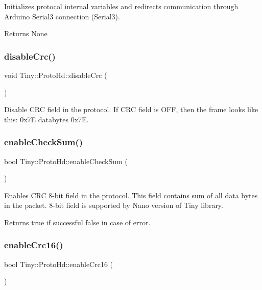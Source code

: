 Initializes protocol internal variables and redirects communication through Arduino Serial3 connection (Serial3). \begin{DoxyReturn}{Returns}
None 
\end{DoxyReturn}
\mbox{\label{classTiny_1_1ProtoHd_ae90a0a40de0b71a015f7f7f940440fa0}} 
\subsubsection{\texorpdfstring{disable\+Crc()}{disableCrc()}}
{\footnotesize\ttfamily void Tiny\+::\+Proto\+Hd\+::disable\+Crc (\begin{DoxyParamCaption}{ }\end{DoxyParamCaption})}

Disable C\+RC field in the protocol. If C\+RC field is O\+FF, then the frame looks like this\+: 0x7E databytes 0x7E. \mbox{\label{classTiny_1_1ProtoHd_ace4e6b993532b3eb47d025b8db94192d}} 
\subsubsection{\texorpdfstring{enable\+Check\+Sum()}{enableCheckSum()}}
{\footnotesize\ttfamily bool Tiny\+::\+Proto\+Hd\+::enable\+Check\+Sum (\begin{DoxyParamCaption}{ }\end{DoxyParamCaption})}

Enables C\+RC 8-\/bit field in the protocol. This field contains sum of all data bytes in the packet. 8-\/bit field is supported by Nano version of Tiny library. \begin{DoxyReturn}{Returns}
true if successful false in case of error. 
\end{DoxyReturn}
\mbox{\label{classTiny_1_1ProtoHd_a0887adedc93b7538dbaef3fc8e0b2819}} 
\subsubsection{\texorpdfstring{enable\+Crc16()}{enableCrc16()}}
{\footnotesize\ttfamily bool Tiny\+::\+Proto\+Hd\+::enable\+Crc16 (\begin{DoxyParamCaption}{ }\end{DoxyParamCaption})}

